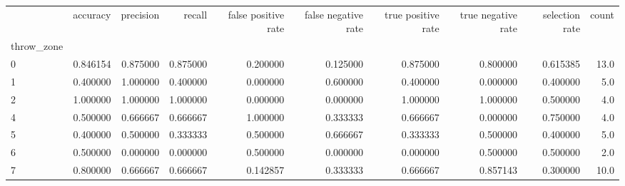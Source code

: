 \begin{tabular}{lrrrrrrrrr}
\toprule
{} &  accuracy &  precision &    recall &  false positive rate &  false negative rate &  true positive rate &  true negative rate &  selection rate &  count \\
throw\_zone &           &            &           &                      &                      &                     &                     &                 &        \\
\midrule
0          &  0.846154 &   0.875000 &  0.875000 &             0.200000 &             0.125000 &            0.875000 &            0.800000 &        0.615385 &   13.0 \\
1          &  0.400000 &   1.000000 &  0.400000 &             0.000000 &             0.600000 &            0.400000 &            0.000000 &        0.400000 &    5.0 \\
2          &  1.000000 &   1.000000 &  1.000000 &             0.000000 &             0.000000 &            1.000000 &            1.000000 &        0.500000 &    4.0 \\
4          &  0.500000 &   0.666667 &  0.666667 &             1.000000 &             0.333333 &            0.666667 &            0.000000 &        0.750000 &    4.0 \\
5          &  0.400000 &   0.500000 &  0.333333 &             0.500000 &             0.666667 &            0.333333 &            0.500000 &        0.400000 &    5.0 \\
6          &  0.500000 &   0.000000 &  0.000000 &             0.500000 &             0.000000 &            0.000000 &            0.500000 &        0.500000 &    2.0 \\
7          &  0.800000 &   0.666667 &  0.666667 &             0.142857 &             0.333333 &            0.666667 &            0.857143 &        0.300000 &   10.0 \\
\bottomrule
\end{tabular}
